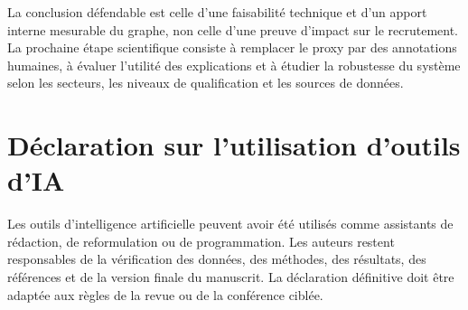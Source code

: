 \documentclass[10pt]{article}
\begin{document}
La conclusion défendable est celle d'une faisabilité technique et d'un apport interne mesurable du graphe, non celle d'une preuve d'impact sur le recrutement. La prochaine étape scientifique consiste à remplacer le proxy par des annotations humaines, à évaluer l'utilité des explications et à étudier la robustesse du système selon les secteurs, les niveaux de qualification et les sources de données.

\section*{Déclaration sur l'utilisation d'outils d'IA}
Les outils d'intelligence artificielle peuvent avoir été utilisés comme assistants de rédaction, de reformulation ou de programmation. Les auteurs restent responsables de la vérification des données, des méthodes, des résultats, des références et de la version finale du manuscrit. La déclaration définitive doit être adaptée aux règles de la revue ou de la conférence ciblée.



\end{document}
